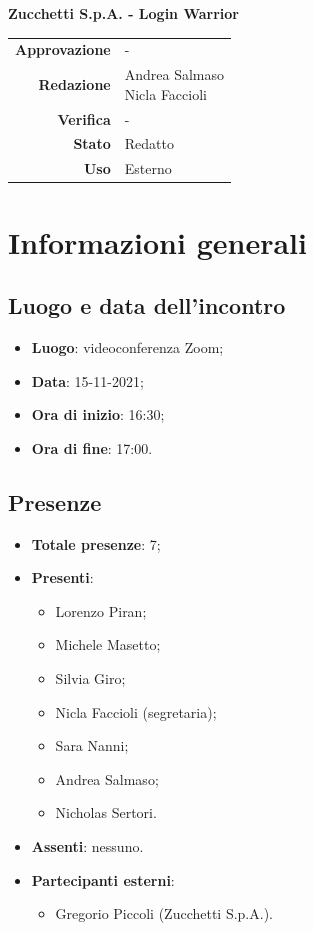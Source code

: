\documentclass[11pt]{article}
\begin{document}
\begin{titlepage}
\begin{center}
			\large
			\textbf{Zucchetti S.p.A. - Login Warrior}\\
			
			\vfill
			
			\begin{tabular}{r|l}
				\textbf{Approvazione} &  -\\
				\textbf{Redazione} &  \parbox[t]{3.5cm}{Andrea Salmaso \\Nicla Faccioli}\\
				\textbf{Verifica} &  -\\
				\textbf{Stato} & Redatto \\
				\textbf{Uso} & Esterno
			\end{tabular}
			\vfill
			
		\end{center}
	\end{titlepage}

	\newpage

	\section{Informazioni generali}
	\subsection{Luogo e data dell'incontro}
	\begin{itemize}
		\item \textbf{Luogo}: videoconferenza Zoom;
		\item \textbf{Data}: 15-11-2021;
		\item \textbf{Ora di inizio}: 16:30;
		\item \textbf{Ora di fine}: 17:00.
	\end{itemize}
	
	\subsection{Presenze}
	\begin{itemize}
		\item \textbf{Totale presenze}: 7;
		\item \textbf{Presenti}:
		\begin{itemize}
			\item Lorenzo Piran; 
			\item Michele Masetto;
			\item Silvia Giro;
			\item Nicla Faccioli (segretaria);
			\item Sara Nanni;
			\item Andrea Salmaso;
			\item Nicholas Sertori.
		\end{itemize}
		\item \textbf{Assenti}: nessuno.
		\item \textbf{Partecipanti esterni}: 
			\begin{itemize}
				\item Gregorio Piccoli (Zucchetti S.p.A.).
			\end{itemize}
	\end{itemize}
\end{document}
